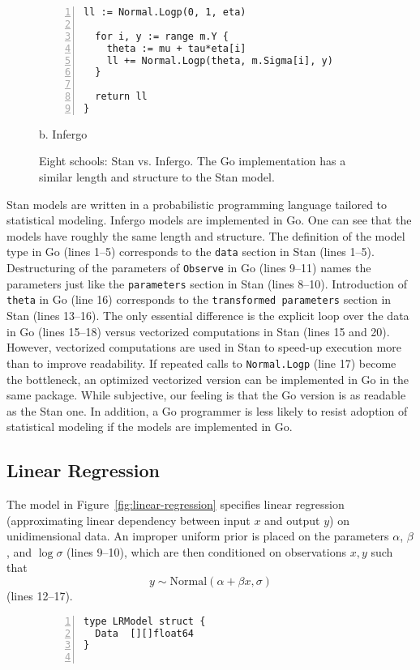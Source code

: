 \documentclass[sigplan,10pt,screen]{acmart}
\begin{document}
\begin{sloppypar}
\begin{figure*}
\begin{minipage}[t]{0.5\textwidth}
\begin{lstlisting}[framexleftmargin=10pt,numbers=left]
  ll := Normal.Logp(0, 1, eta)

  for i, y := range m.Y {
    theta := mu + tau*eta[i]
    ll += Normal.Logp(theta, m.Sigma[i], y)
  }

  return ll
}
\end{lstlisting}
\centering
b. Infergo
  \end{minipage}
  \caption{Eight schools: Stan vs. Infergo. The Go implementation
  has a similar length and structure to the Stan model.}
  \label{fig:eight-schools}
\end{figure*}

Stan models are written in a probabilistic programming language
tailored to statistical modeling. Infergo models are implemented
in Go. One can see that the models have roughly the same length
and structure. The definition of the model type in Go (lines
1--5) corresponds to the \lstinline{data} section in Stan (lines
1--5). Destructuring of the parameters of \lstinline{Observe} in
Go (lines 9--11) names the parameters just like the
\lstinline{parameters} section in Stan (lines 8--10).
Introduction of \lstinline{theta} in Go (line 16) corresponds to
the \lstinline{transformed parameters} section in Stan (lines
13--16). The only essential difference is the explicit loop over
the data in Go (lines 15--18) versus vectorized computations in
Stan (lines 15 and 20). However, vectorized computations are used
in Stan to speed-up execution more than to improve readability.
If repeated calls to \lstinline{Normal.Logp} (line 17) become
the bottleneck, an optimized vectorized version can be
implemented in Go in the same package. While subjective, our
feeling is that the Go version is as readable as the Stan one.
In addition, a Go programmer is less likely to resist adoption
of statistical modeling if the models are implemented in Go.

\subsection{Linear Regression}
\label{sec:linear-regression}

The model in Figure~\ref{fig:linear-regression} specifies linear
regression (approximating linear dependency between input $x$
and output $y$) on unidimensional data. An improper uniform
prior is placed on the parameters $\alpha$,
$\beta$, and $\log \sigma$ (lines 9--10), which are then
conditioned on observations $x, y$ such that
\begin{equation}
y \sim \mathrm{Normal}(\alpha + \beta x, \sigma)
  \label{eqn:linear-regression-1}
\end{equation}
(lines 12--17).
\begin{figure}
\begin{lstlisting}[framexleftmargin=10pt,numbers=left]
type LRModel struct {
  Data  [][]float64
}


\end{lstlisting}
\end{figure}
\end{sloppypar}
\end{document}
